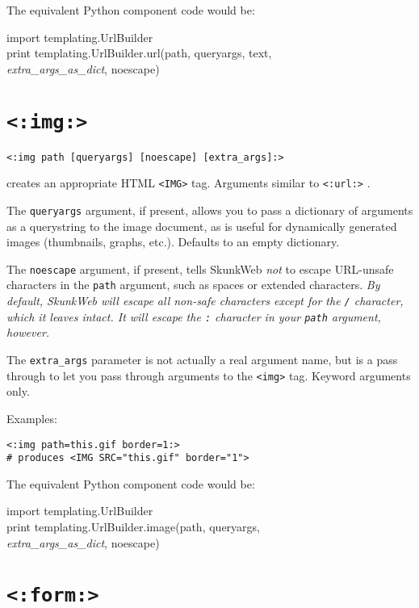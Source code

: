 \documentclass{manual}
\begin{document}
The equivalent Python component code would be:
\begin{obeylines}\ttfamily
import templating.UrlBuilder
print templating.UrlBuilder.url(path, queryargs, text,
     \textit{extra_args_as_dict}, noescape)
\end{obeylines}



\section{\texttt{<:img:>}}
\label{tagimg}

\begin{verbatim}<:img path [queryargs] [noescape] [extra_args]:>\end{verbatim}

creates an appropriate HTML \texttt{<IMG>} tag. 
Arguments similar to \texttt{<:url:>} . 

The \texttt{queryargs} argument, if present, allows you to pass a
dictionary of arguments as a querystring to the image document, as
is useful for dynamically generated images (thumbnails, graphs,
etc.). Defaults to an empty dictionary.

The \texttt{noescape} argument, if present,
tells SkunkWeb \emph{not} to escape URL-unsafe characters in the \texttt{path}
argument, such as spaces or extended characters. \emph{By default,
SkunkWeb will escape all non-safe characters except for the \texttt{/}
character, which it leaves intact. It will escape the \texttt{:}
character in your \texttt{path} argument, however.}

The \texttt{extra_args} parameter is not actually a real argument name, 
but is a pass through to let you pass through arguments to 
the \texttt{<img>} tag.  Keyword arguments only.

Examples:

\begin{verbatim}<:img path=this.gif border=1:>
# produces <IMG SRC="this.gif" border="1">
\end{verbatim}

The equivalent Python component code would be:
\begin{obeylines}\ttfamily
import templating.UrlBuilder
print templating.UrlBuilder.image(path, queryargs,
     \textit{extra_args_as_dict}, noescape)
\end{obeylines}


\section{\texttt{<:form:>}}
\label{tagform}
\end{document}
